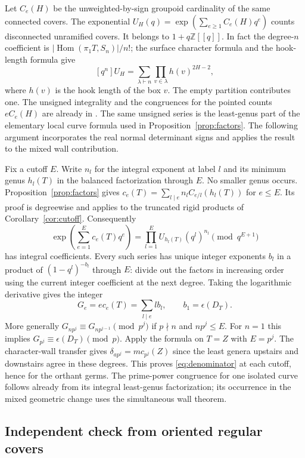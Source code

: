 Let \(C_e(H)\) be the unweighted-by-sign groupoid cardinality of the same connected covers. The exponential \(U_H(q)=\exp(\sum_{e\ge1} C_e(H)q^e)\) counts disconnected unramified covers. It belongs to \(1+q\mathbb Z[[q]]\). In fact the degree-\(n\) coefficient is \(|\operatorname{Hom}(\pi_1 T,S_n)|/n!\); the surface character formula and the hook-length formula give
\[[q^n]U_H=\sum_{\lambda\vdash n}\prod_{v\in\lambda}h(v)^{2H-2},\]
where \(h(v)\) is the hook length of the box \(v\). The empty partition contributes one. The unsigned integrality and the congruences for the pointed counts \(e C_e(H)\) are already in \cite[Appendix~C, Lemmas~C1--C4]{bp01}. The same unsigned series is the least-genus part of the elementary local curve formula used in Proposition~\ref{prop:factors}. The following argument incorporates the real normal determinant signs and applies the result to the mixed wall contribution.

Fix a cutoff \(E\). Write \(n_l\) for the integral exponent at label \(l\) and its minimum genus \(h_l(T)\) in the balanced factorization through \(E\). No smaller genus occurs. Proposition~\ref{prop:factors} gives \(c_e(T)=\sum_{l\mid e} n_l C_{e/l}(h_l(T))\) for \(e\le E\). Its proof is degreewise and applies to the truncated rigid products of Corollary~\ref{cor:cutoff}. Consequently
\[\exp\!\left(\sum_{e=1}^{E}c_e(T)q^e\right)
   =\prod_{l=1}^E U_{h_l(T)}(q^l)^{n_l}
                \pmod{q^{E+1}}\]
has integral coefficients. Every such series has unique integer exponents \(b_l\) in a product of \((1-q^l)^{-b_l}\) through \(E\): divide out the factors in increasing order using the current integer coefficient at the next degree. Taking the logarithmic derivative gives the integer
\[G_e=e c_e(T)=\sum_{l\mid e} l b_l,\qquad b_1=\epsilon(D_T).\]
More generally \(G_{np^j}\equiv G_{np^{j-1}}\pmod{p^j}\) if \(p\nmid n\) and \(np^j\le E\). For \(n=1\) this implies \(G_{p^j}\equiv\epsilon(D_T)\pmod p\). Apply the formula on \(T=Z\) with \(E=p^j\). The character-wall transfer gives \(\delta_{ap^j}=m c_{p^j}(Z)\) since the least genera upstairs and downstairs agree in these degrees. This proves \eqref{eq:denominator} at each cutoff, hence for the orthant germs. The prime-power congruence for one isolated curve follows already from its integral least-genus factorization; its occurrence in the mixed geometric change uses the simultaneous wall theorem.

\subsection{Independent check from oriented regular covers}

